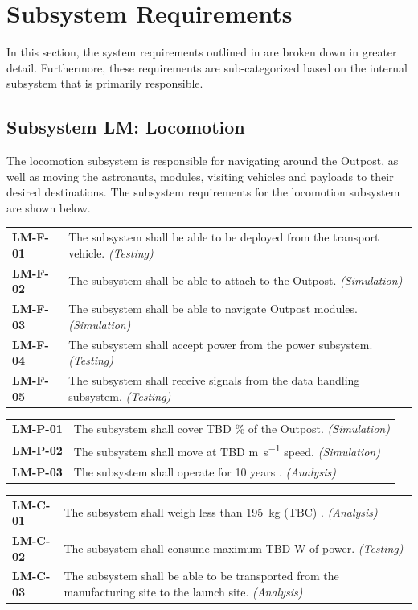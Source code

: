 \documentclass[12pt, letterpaper]{article}
\begin{document}
\section{Subsystem Requirements}
\label{sect:subsysreq}
In this section, the system requirements outlined in  are broken down in greater detail. Furthermore, these requirements are sub-categorized based on the internal subsystem that is primarily responsible. 

\subsection{Subsystem LM: Locomotion}
The locomotion subsystem is responsible for navigating around the Outpost, as well as moving the astronauts, modules, visiting vehicles and payloads to their desired destinations. The subsystem requirements for the locomotion subsystem are shown below.
\vspace{-5pt}
\begin{longtable}{P{2cm}P{13.75cm}}
\textbf{LM-F-01}	& The subsystem shall be able to be deployed from the transport vehicle. \textit{(Testing)}							\\
\textbf{LM-F-02}	& The subsystem shall be able to attach to the Outpost. \textit{(Simulation)}										\\
\textbf{LM-F-03}	& The subsystem shall be able to navigate Outpost modules. \textit{(Simulation)}										\\
\textbf{LM-F-04}	& The subsystem shall accept power from the power subsystem. \textit{(Testing)}										\\
\textbf{LM-F-05}	& The subsystem shall receive signals from the data handling subsystem. \textit{(Testing)}								\\
\end{longtable}
\vspace{-10pt}
\begin{longtable}{P{2cm}P{13.75cm}}
\textbf{LM-P-01}	& The subsystem shall cover TBD \% of the Outpost. \textit{(Simulation)}												\\
\textbf{LM-P-02}	& The subsystem shall move at TBD \si{\m\per\s} speed. \textit{(Simulation)}											\\
\textbf{LM-P-03}	& The subsystem shall operate for 10 years \cite{RFP}. \textit{(Analysis)}										\\
\end{longtable}
\vspace{-10pt}
\begin{longtable}{P{2cm}P{13.75cm}}
\textbf{LM-C-01}	& The subsystem shall weigh less than \SI{195}{\kg} (TBC) \cite{ERAjoint}. \textit{(Analysis)}							\\
\textbf{LM-C-02}	& The subsystem shall consume maximum TBD \si{\watt} of power. \textit{(Testing)}								\\
\textbf{LM-C-03}	& The subsystem shall be able to be transported from the manufacturing site to the launch site. \textit{(Analysis)}	\\
\end{longtable}
\end{document}
